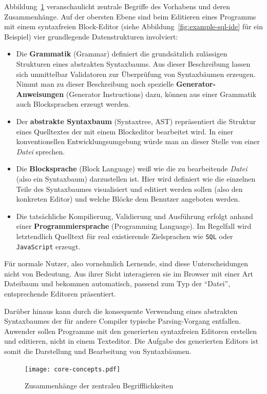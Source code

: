 \documentclass[paper=a4,fontsize=11pt,parskip=half]{scrartcl}
\begin{document}
Abbildung~\ref{fig:core-relations} veranschaulicht zentrale Begriffe des Vorhabens und deren Zusammenhänge. Auf der obersten Ebene sind beim Editieren eines Programms mit einem syntaxfreien Block-Editor (siehe Abbildung~\ref{fig:example-sql-ide} für ein Beispiel) vier grundlegende Datenstrukturen involviert:

\begin{itemize}
\item Die \textbf{Grammatik} (Grammar) definiert die grundsätzlich zulässigen Strukturen eines abstrakten Syntaxbaums. Aus dieser Beschreibung lassen sich unmittelbar Validatoren zur Überprüfung von Syntaxbäumen erzeugen. Nimmt man zu dieser Beschreibung noch spezielle \textbf{Generator-Anweisungen} (Generator Instructions) dazu, können aus einer Grammatik auch Blocksprachen erzeugt werden.
\item Der \textbf{abstrakte Syntaxbaum} (Syntaxtree, AST) repräsentiert die Struktur eines Quelltextes der mit einem Blockeditor bearbeitet wird. In einer konventionellen Entwicklungsumgebung würde man an dieser Stelle von einer \textit{Datei} sprechen.
\item Die \textbf{Blocksprache} (Block Language) weiß wie die zu bearbeitende \textit{Datei} (also ein Syntaxbaum) darzustellen ist. Hier wird definiert wie die einzelnen Teile des Syntaxbaumes visualisiert und editiert werden sollen (also den konkreten Editor) und welche Blöcke dem Benutzer angeboten werden.
\item Die tatsächliche Kompilierung, Validierung und Ausführung erfolgt anhand einer \textbf{Programmiersprache} (Programming Language). Im Regelfall wird letztendlich Quelltext für real existierende Zielsprachen wie \texttt{SQL} oder \texttt{JavaScript} erzeugt.
\end{itemize}

Für normale Nutzer, also vornehmlich Lernende, sind diese Unterscheidungen nicht von Bedeutung. Aus ihrer Sicht interagieren sie im Browser mit einer Art Dateibaum und bekommen automatisch, passend zum Typ der \enquote{Datei}, entsprechende Editoren präsentiert.

Darüber hinaus kann durch die konsequente Verwendung eines abstrakten Syntaxbaumes der für andere Compiler typische Parsing-Vorgang entfallen. Anwender sollen Programme mit den generierten syntaxfreien Editoren erstellen und editieren, nicht in einem Texteditor. Die Aufgabe des generierten Editors ist somit die Darstellung und Bearbeitung von Syntaxbäumen.

\begin{figure}[h]
  \texttt{[image: core-concepts.pdf]}
  \caption{Zusammenhänge der zentralen Begrifflichkeiten}
  \label{fig:core-relations}
\end{figure}
\end{document}
